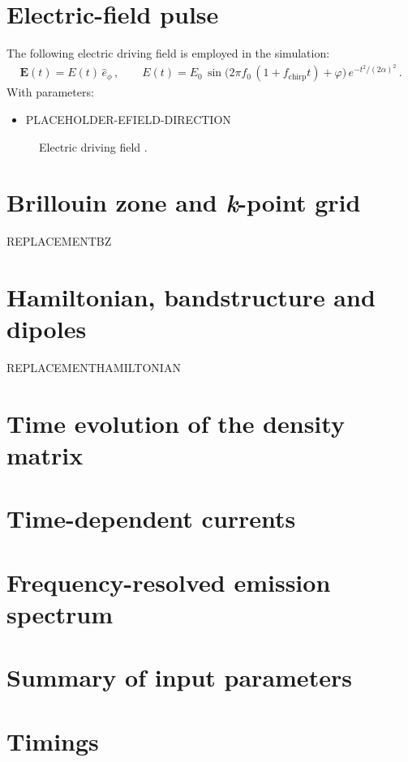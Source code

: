 \documentclass[11pt, a4paper, openany]{scrartcl}
\newlength\figureheight
\newlength\figurewidth
\newcommand{\bE}{\mathbf{E}}
\begin{document}
\section{Electric-field pulse}
The following electric driving field is employed in the simulation:
\begin{align}
    \bE(t)  = E(t)\,\hat{e}_\phi
    \,,\hspace{2em}
    E(t) = E_0\,    \sin\Big(2\pi f_0\,(1+f_\text{chirp} t) + \varphi\Big)\, e^{-t^2/(2\alpha)^2}\,.
    \label{e1}
\end{align}
With parameters:
\begin{itemize}
    \item PLACEHOLDER-EFIELD-DIRECTION
\end{itemize}
\begin{figure}[h!]
   \centering

\caption{Electric driving field .}
    \label{fig:Efield}
\end{figure}

\section{Brillouin zone and \textit{k}-point grid}
REPLACEMENTBZ


\section{Hamiltonian, bandstructure and dipoles}
REPLACEMENTHAMILTONIAN


\section{Time evolution of the density matrix}

\section{Time-dependent currents}

\section{Frequency-resolved emission spectrum}

\section{Summary of input parameters}

\section{Timings}
\end{document}
